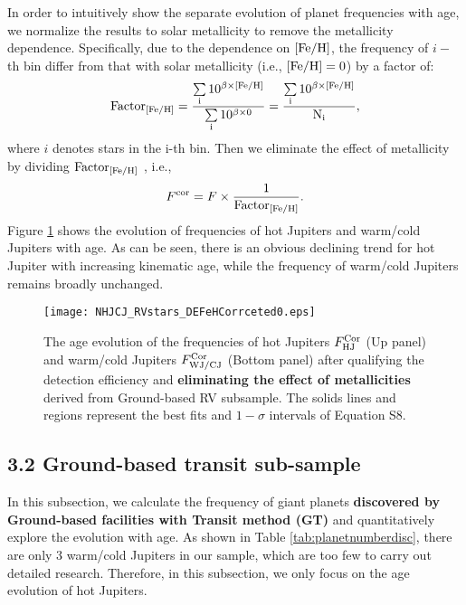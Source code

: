 \documentclass[twocolumn]{pnas-new}
\begin{document}
In order to intuitively show the separate evolution of planet frequencies with age, we normalize the results to solar metallicity to remove the metallicity dependence.
Specifically, due to the dependence on $\rm [Fe/H]$, the frequency of $i-$th bin differ from that with solar metallicity (i.e., $\rm [Fe/H] =0$) by a factor of:
\begin{equation}
  \rm Factor_{[\rm Fe/H]} = 
  \frac{\sum\limits_{i} 10^{\beta \times [\rm Fe/H]}}{\sum\limits_{i} 10^{\beta \times 0}}
  = \frac{\sum\limits_{i} 10^{\beta \times [\rm Fe/H]}}{N_i},
  \label{normfeh}
\end{equation}
where $i$ denotes stars in the i-th bin. 
Then we eliminate the effect of metallicity by dividing $\rm Factor_{[\rm Fe/H]}$ , i.e.,
\begin{equation}
  F^{\rm cor} = F \times \frac{1}{\rm Factor_{[\rm Fe/H]}}.
   \label{corrfeh}
\end{equation}
Figure \ref{figGBRVOccurrencerateDEFeH} shows the evolution of frequencies of hot Jupiters and warm/cold Jupiters with age.
As can be seen, there is an obvious declining trend for hot Jupiter with increasing kinematic age, while the frequency of warm/cold Jupiters remains broadly unchanged.

\begin{figure}[!t]
\centering
\texttt{[image: NHJCJ\_RVstars\_DEFeHCorrceted0.eps]}
\caption{The age evolution of the frequencies of hot Jupiters $F^{\rm Cor}_{\rm HJ}$ (Up panel) and warm/cold Jupiters $F^{\rm Cor}_{\rm WJ/CJ}$ (Bottom panel) after qualifying the detection efficiency and \textbf{eliminating the effect of metallicities} derived from Ground-based RV subsample.
The solids lines and regions represent the best fits and $1-\sigma$ intervals of Equation S8.
\label{figGBRVOccurrencerateDEFeH}}
\end{figure}

\subsection*{3.2 Ground-based transit sub-sample}
\label{sec.obs.GBTS}
In this subsection, we calculate the frequency of giant planets \textbf{discovered by Ground-based facilities with Transit method (GT)} and quantitatively explore the evolution with age.
As shown in Table \ref{tab:planetnumberdisc}, there are only 3 warm/cold Jupiters in our sample, which are too few to carry out detailed research. 
Therefore, in this subsection, we only focus on the age evolution of hot Jupiters.
\end{document}
